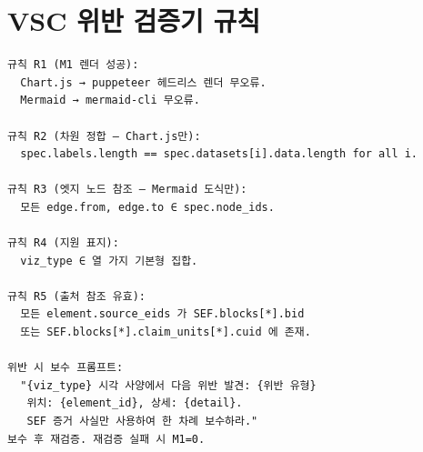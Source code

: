 \documentclass[11pt]{article}
\begin{document}
\section{VSC 위반 검증기 규칙}

\begin{tcolorbox}[colback=gray!5,colframe=gray!50,title=VSC 검증 규칙]
\small
\begin{verbatim}
규칙 R1 (M1 렌더 성공):
  Chart.js → puppeteer 헤드리스 렌더 무오류.
  Mermaid → mermaid-cli 무오류.

규칙 R2 (차원 정합 — Chart.js만):
  spec.labels.length == spec.datasets[i].data.length for all i.

규칙 R3 (엣지 노드 참조 — Mermaid 도식만):
  모든 edge.from, edge.to ∈ spec.node_ids.

규칙 R4 (지원 표지):
  viz_type ∈ 열 가지 기본형 집합.

규칙 R5 (출처 참조 유효):
  모든 element.source_eids 가 SEF.blocks[*].bid
  또는 SEF.blocks[*].claim_units[*].cuid 에 존재.

위반 시 보수 프롬프트:
  "{viz_type} 시각 사양에서 다음 위반 발견: {위반 유형}
   위치: {element_id}, 상세: {detail}.
   SEF 증거 사실만 사용하여 한 차례 보수하라."
보수 후 재검증. 재검증 실패 시 M1=0.
\end{verbatim}
\end{tcolorbox}
\end{document}
